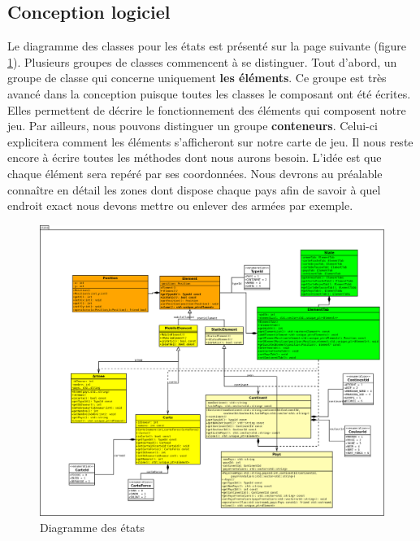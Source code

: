 \subsection{Conception logiciel}
Le diagramme des classes pour les états est présenté sur la page suivante (figure \ref{fig:state}). Plusieurs groupes de classes commencent à se distinguer. 
Tout d'abord, un groupe de classe qui concerne uniquement \textbf{les éléments}. Ce groupe est très avancé dans la conception puisque toutes les classes le composant ont été écrites. Elles permettent de décrire le fonctionnement des éléments qui composent notre jeu. 
\newline 
\newline 
Par ailleurs, nous pouvons distinguer un groupe \textbf{conteneurs}. Celui-ci explicitera comment les éléments s'afficheront sur notre carte de jeu. Il nous reste encore à écrire toutes les méthodes dont nous aurons besoin. L'idée est que chaque élément sera repéré par ses coordonnées. Nous devrons au préalable connaître en détail les zones dont dispose chaque pays afin de savoir à quel endroit exact nous devons mettre ou enlever des armées par exemple.  

\newpage

\begin{landscape}
    \begin{figure}[!htbp]
        \centering
        \includegraphics[width=21cm]{Images/state.png}
        \caption{Diagramme des états}
        \label{fig:state}
    \end{figure}
\end{landscape}